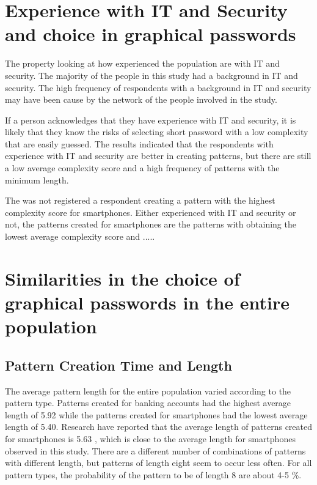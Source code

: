   \section{Experience with IT and Security and choice in graphical passwords}
    
    The property looking at how experienced the population are with IT and security. The majority of the people in this study had a background in IT and security. The high frequency of respondents with a background in IT and security may have been cause by the network of the people involved in the study.

    If a person acknowledges that they have experience with IT and security, it is likely that they know the risks of selecting short password with a low complexity that are easily guessed. The results indicated that the respondents with experience with IT and security are better in creating patterns, but there are still a low average complexity score and a high frequency of patterns with the minimum length. 

    The was not registered a respondent creating a pattern with the highest complexity score for smartphones. Either experienced with IT and security or not, the patterns created for smartphones are the patterns with obtaining the lowest average complexity score and .....


  \section{Similarities in the choice of graphical passwords in the entire population}

    \subsection{Pattern Creation Time and Length}

      The average pattern length for the entire population varied according to the pattern type. Patterns created for banking accounts had the highest average length of 5.92 while the patterns created for smartphones had the lowest average length of 5.40. Research have reported that the average length of patterns created for smartphones is 5.63 \cite{Uellenbeck}, which is close to the average length for smartphones observed in this study. There are a different number of combinations of patterns with different length, but patterns of length eight seem to occur less often. For all pattern types, the probability of the pattern to be of length 8 are about 4-5 \%. 

